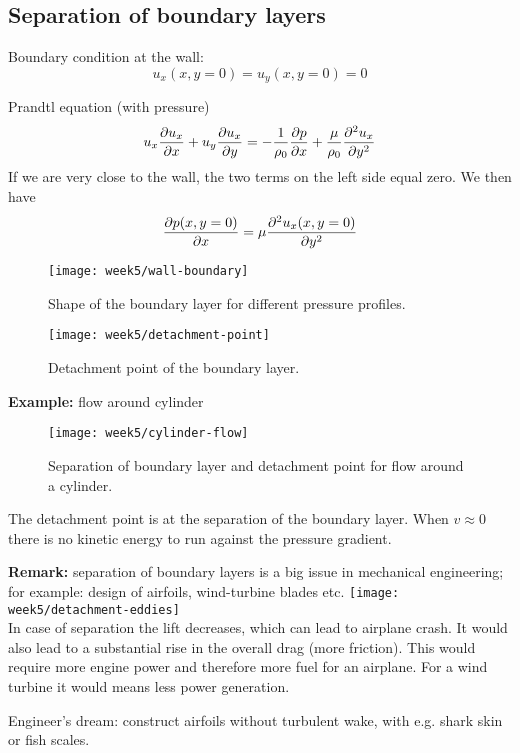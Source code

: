 \subsection{Separation of boundary layers}
Boundary condition at the wall:
\begin{equation}
u_x(x,y=0) = u_y(x,y=0)=0
\end{equation}

Prandtl equation (with pressure)
\begin{equation}
u_x\frac{\partial u_x}{\partial x}+u_y\frac{\partial u_x}{\partial y} = -\frac{1}{\rho_0}\frac{\partial p}{\partial x}+\frac{\mu}{\rho_0}\frac{\partial^2 u_x}{\partial y^2}
\end{equation}
If we are very close to the wall, the two terms on the left side equal zero. We then have
\begin{equation}
\frac{\partial p(x,y=0)}{\partial x}=\mu\frac{\partial^2 u_x(x,y=0)}{\partial y^2}
\end{equation}

\begin{figure}[!h]
    \centering
    \texttt{[image: week5/wall-boundary]}\\
    \caption{Shape of the boundary layer for different pressure profiles.}
    \label{fig:wall-boundary}
\end{figure}

\begin{figure}[!h]
    \centering
    \texttt{[image: week5/detachment-point]}\\
    \caption{Detachment point of the boundary layer.}
    \label{fig:detachment-point}
\end{figure}

\newpage
\textbf{Example:} flow around cylinder

\begin{figure}[!h]
    \centering
    \texttt{[image: week5/cylinder-flow]}\\
    \caption{Separation of boundary layer and detachment point for flow around a cylinder.}
    \label{fig:cylinder-flow}
\end{figure}

The detachment point is at the separation of the boundary layer. When $v\approx0$ there is no kinetic energy to run against the pressure gradient.

\begin{framed}
\textbf{Remark:} separation of boundary layers is a big issue in mechanical engineering; for example: design of airfoils, wind-turbine blades etc.
{\center
\texttt{[image: week5/detachment-eddies]}\\
}
In case of separation the lift decreases, which can lead to airplane crash. It would also lead to a substantial rise in the overall drag (more friction). This would require more engine power and therefore more fuel for an airplane. For a wind turbine it would means less power generation.

Engineer's dream: construct airfoils without turbulent wake, with e.g. shark skin or fish scales.
\end{framed}



